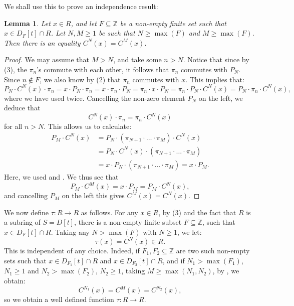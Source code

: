 \documentclass{amsart}
\newtheorem{lem}[equation]{Lemma}
\theoremstyle{definition}
\numberwithin{equation}{section}
\begin{document}
We shall use this to prove an independence result:
\begin{lem}\label{lem:indepCN}
Let $x \in R$,
and let $F \subseteq \mathbb{Z}$ be a non-empty finite set such that $x \in D_F[t] \cap R$.
Let $N ,M \ge 1$ be such that $N \ge \max(F)$ and $M \ge \max(F)$.
Then there is an equality
$C^N(x) = C^M(x)$.
\end{lem}
\begin{proof}
We may assume that $M > N$, and take some $n > N$.
Notice that since by (3), the $\pi_n$'s commute with each other, it follows that $\pi_n$ commutes with $P_N$.
Since $n \notin F$, we also know by (2) that $\pi_n$ commutes with $x$.
This implies that:
\[
P_N \cdot C^N(x) \cdot \pi_n = x\cdot P_N \cdot \pi_n = x \cdot \pi_n \cdot P_N = \pi_n \cdot x \cdot P_N = \pi_n \cdot P_N \cdot C^N(x) = P_N \cdot \pi_n \cdot C^N(x),
\]
where we have used  twice. 
Cancelling the non-zero element $P_N$ on the left,
we deduce that 
\begin{equation}\label{eqn:CNpin}
C^N(x) \cdot \pi_n = \pi_n \cdot C^N(x)
\end{equation}
for all $n>N$.
This allows us to calculate:
\begin{align*}
P_M \cdot C^N(x) &= P_N \cdot (\pi_{N+1} \cdot \dots \cdot \pi_M) \cdot C^N(x) \\ &=
P_N \cdot C^N(x) \cdot  (\pi_{N+1} \cdot \dots \cdot \pi_M) \\ &= 
x\cdot P_N \cdot (\pi_{N+1} \cdot \dots \cdot \pi_M) = x\cdot P_M.
\end{align*}
Here, we used  and .
We thus see that
\[
P_M \cdot C^M(x) = x\cdot P_M = P_M \cdot C^N(x),
\]
and cancelling $P_M$ on the left this gives $C^M(x) = C^N(x)$.
\end{proof}

We now define $\tau:R \to R$ as follows.
For any $x \in R$, by (3) and the fact that $R$ is a subring of $S = D[t]$, there is a non-empty finite subset $F \subseteq \mathbb{Z}$, such that $x \in D_F[t] \cap R$.
Taking any $N > \max(F)$ with $N \ge 1$, we let:
\begin{equation}\label{eqn:tauDef}
\tau(x) = C^N(x) \in R.    
\end{equation}
This is independent of any choice.
Indeed, if $F_1, F_2 \subseteq \mathbb{Z}$ are two such non-empty sets such that $x \in D_{F_1}[t] \cap R$ and $x \in D_{F_2}[t] \cap R$,
and if $N_1 > \max(F_1)$, $N_1 \ge 1$ and $N_2 > \max(F_2)$, $N_2 \ge 1$, taking $M \ge \max(N_1,N_2)$, by , we obtain:
\[
C^{N_1}(x) = C^M(x) = C^{N_2}(x),
\]
so we obtain a well defined function $\tau:R \to R$.
\end{document}
